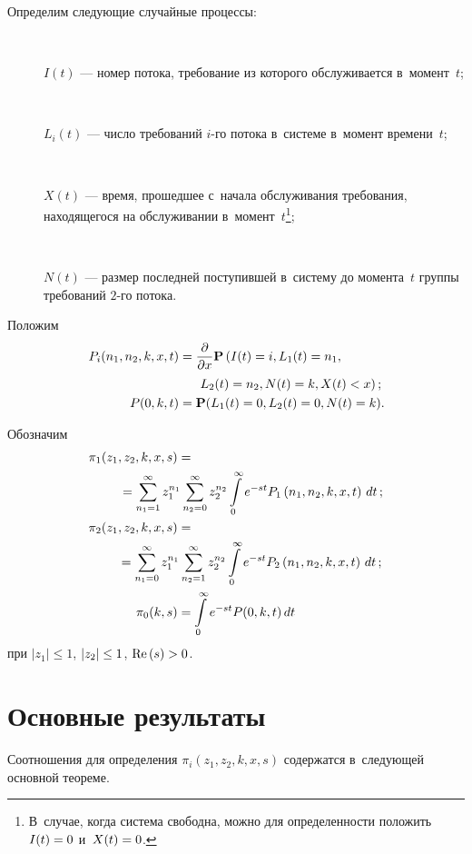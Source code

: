 \begin{multicols}{2}
\pagebreak

Определим следующие случайные процессы:
\begin{description}
\item[\,] $I(t)$ --- номер потока, требование из которого обслуживается в~момент~$t$;
\item[\,]$L_i(t)$ --- число требований $i$-го потока в~системе в~момент времени~$t$;
\item[\,]$X(t)$ --- время, прошедшее с~начала обслуживания требования, находящегося на 
обслуживании в~момент~$t$\footnote{В~случае, когда система свободна, можно 
для определенности положить $I(t)\hm=0$ и~$X(t)\hm=0$.};
\item[\,]$N(t)$ --- размер последней поступившей в~систему до момента~$t$ 
группы требований $2$-го потока.
\end{description}
Положим
\begin{align*}
P_i(n_1,n_2,k,x,t)&=\displaystyle\frac{\displaystyle \partial\mathstrut}{\displaystyle \partial x\mathstrut}
\mathbf{P}\left(I(t)=i,L_1(t)=n_1,\right.\\
&\hspace*{14pt}\left.L_2(t)=n_2,N(t)=k,X(t)<x\right);\\
P(0,k,t)&=\mathbf{P}(L_1(t)=0,L_2(t)=0,N(t)=k).\hspace*{-2pt}
\end{align*}

Обозначим
\begin{align*}
\pi_1(z_1,z_2,k,x,s)&=\\
&\hspace*{-46pt}{}=\sum\limits_{n_1=1}^{\infty}z_1^{n_1}
\sum\limits_{n_2=0}^{\infty}z_2^{n_2}
\int\limits_0^{\infty}e^{-st}P_1\left(n_1,n_2,k,x,t\right)\,dt\,;\\
\pi_2(z_1,z_2,k,x,s)&=\\
&\hspace*{-47pt}{}=\sum\limits_{n_1=0}^{\infty}z_1^{n_1}
\sum\limits_{n_2=1}^{\infty}z_2^{n_2}
\int\limits_0^{\infty}e^{-st}P_2\left(n_1,n_2,k,x,t\right)\,dt\,;\\
\pi_0(k,s)&=\int\limits_0^{\infty}e^{-st} P(0,k,t)\,dt
\end{align*}
при $|z_1|\leq1$, $|z_2|\hm\leq1$, $\mathrm{Re}\,(s)\hm>0$.

\section{Основные результаты}

Соотношения для определения $\pi_i(z_1,z_2,k,x,s)$  содержатся в~следующей 
основной теореме.


\end{multicols}
